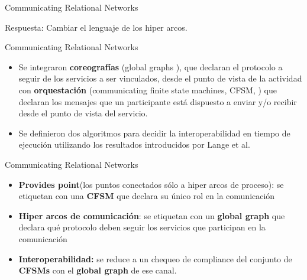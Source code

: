 \documentclass[10pt,xcolor={table,dvipsnames},t]{beamer}
\begin{document}
\begin{frame}{Communicating Relational Networks \cite{vissani:places15}}
\begin{center}
\end{center}
Respuesta: Cambiar el lenguaje de los hiper arcos.
\end{frame}


\begin{frame}{Communicating Relational Networks \cite{vissani:places15}}
\begin{itemize}
    \item Se integraron \textbf{coreografías} (global graphs \cite{denielou:esop12}), que declaran el protocolo a seguir de los servicios a ser vinculados, desde el punto de vista de la actividad con \textbf{orquestación} (communicating finite state machines, CFSM, \cite{brand:jacm-30_2}) que declaran los mensajes que un participante está dispuesto a enviar y/o recibir desde el punto de vista del servicio.

    \item Se definieron dos algoritmos para decidir la interoperabilidad en tiempo de ejecución utilizando los resultados introducidos por Lange et al. \cite{lange:popl15}
\end{itemize}
\end{frame}

\begin{frame}{Communicating Relational Networks}
\begin{itemize}
    \item \textbf{Provides point}(los puntos conectados sólo a hiper arcos de proceso): se etiquetan con una \textbf{CFSM} que declara su único rol en la comunicación
    \item \textbf{Hiper arcos de comunicación}: se etiquetan con un \textbf{global graph} que declara qué protocolo deben seguir los servicios que participan en la comunicación
    \item \textbf{Interoperabilidad:} se reduce a un chequeo de compliance del conjunto de \textbf{CFSMs} con el \textbf{global graph} de ese canal.
\end{itemize}
\end{frame}
\end{document}

